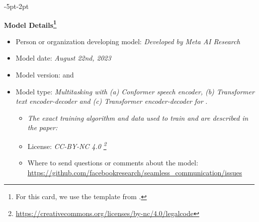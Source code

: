 \FloatBarrier

\newenvironment{mcsection}[1]
    {%
        \textbf{#1}
        \begin{itemize}[leftmargin=*,topsep=0pt,itemsep=-1ex,partopsep=1ex,parsep=1ex,after=\vspace{\medskipamount}]
    }
    {%
        \end{itemize}
    }

\begin{adjustwidth}{-5pt}{-2pt}
\begin{singlespace}

\begin{tcolorbox}[title=\textbf{\section{Model Card - \mfourt}},
    breakable, sharp corners, boxrule=0.5pt] 
\begin{mcsection}{Model Details\footnote{For this card, we use the template from \cite{10.1145/3287560.3287596}.}} 
\item Person or organization developing model: \textit{Developed by Meta AI Research}
\item Model date: \textit{August 22nd, 2023}
\item Model version: \mfourtlg and \mfourtmd
\item Model type: \textit{Multitasking \unity with (a) Conformer speech encoder, (b) Transformer text encoder-decoder and (c) Transformer encoder-decoder for \tu}.
\begin{itemize}
    \item \it The exact training algorithm and data used to train \mfourtlg and \mfourtmd are described in the paper: \mfourtcitation 
\item License: \textit{CC-BY-NC 4.0
\footnote{\url{https://creativecommons.org/licenses/by-nc/4.0/legalcode}}}
\item Where to send questions or comments about the model: \\
\url{https://github.com/facebookresearch/seamless_communication/issues}
\end{itemize} 
\end{mcsection}



\end{tcolorbox}
\end{singlespace}
\end{adjustwidth}

